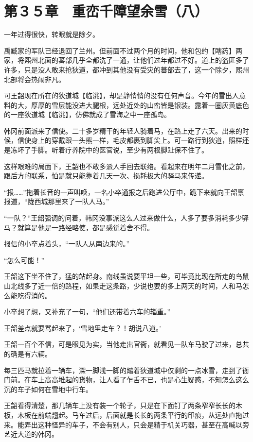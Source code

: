 \section{第３５章　重峦千障望余雪（八）}

一年过得很快，转眼就是除夕。

禹臧家的军队已经退回了兰州。但前面不过两个月的时间，他和包约【瞎药】两家，将熙州北面的蕃部几乎全都洗了一通，让他们过年都过不好。道上的盗匪多了许多，只是没人敢来抢狄道，都冲到其他没有受灾的蕃部去了，这一个除夕，熙州北部将会热闹非凡。

可王韶现在所在的狄道城【临洮】，却是静悄悄的没有任何声音。今年的雪出人意料的大，厚厚的雪层能没进大腿根，远处近处的山峦皆是银装。露着一圈灰黄底色的一座狄道城【临洮】，仿佛就成了雪海之中一座孤岛。

韩冈前面派来了信使。二十多岁精干的年轻人骑着马，在路上走了六天。出来的时候，信使身上的穿戴跟一头熊一样，毛皮都裹到脚尖上。可一路行到狄道，照样还是冻坏了手脚。听着疗养院中的医官说，至少有两根脚趾保不住了。

这样艰难的局面下，王韶也不敢多派人手回去联络。看起来在明年二月雪化之前，跟后方的联系，怕是就只能靠着几天一次、损耗极大的驿马来传递。

“报……”拖着长音的一声叫唤，一名小卒通报之后跑进公厅中，跪下来就向王韶禀报道，“陇西城那里来了一队人马。”

“一队？”王韶强调的问着，韩冈没事派这么人过来做什么，人多了要多消耗多少驿马？就算是他是一路经略使，都是感觉着舍不得。

报信的小卒点着头，“一队人从南边来的。”

“怎么可能！”

王韶这下坐不住了，猛的站起身。南线虽说要平坦一些，可毕竟比现在所走的鸟鼠山北线多了近一倍的路程，如果走这条路，少说也要的多上两天的时间，人和马怎么能吃得消的。

小卒想了想，又补充了一句，“他们还带着六车的辎重。”

王韶差点就要骂起来了，‘雪地里走车？！胡说八道。’

王韶一百个不信，可是眼见为实，当他走出官衙，就看见一队车马驶了过来，总共的确是有六辆。

每三匹马就拉着一辆车，深一脚浅一脚的踏着狄道城中仅剩的一点冰雪，走到了衙门前。在车上高高堆起的货物，让人看了乍舌不已，也是心生疑惑，不知怎么这么沉的车子如何在雪地中行车。

王韶看得清楚，那几辆车上没有装一个轮子，只是在下面钉了两条窄窄长长的木板，木板在前端翘起。马车过后，后面就是长长的两条平行的印痕，从远处直拖过来。能弄出这种怪异的车子，不会有别人，只会是精于机关巧器，甚至在高喊以旁艺近大道的韩冈。

